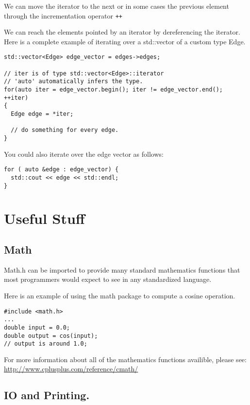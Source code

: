 \documentclass[12pt, letterpaper]{article}
\begin{document}
We can move the iterator to the next or in some cases the previous element through the incrementation operator \texttt{++}

We can reach the elements pointed by an iterator by dereferencing the iterator.\\

Here is a complete example of iterating over a std::vector of a custom type Edge.

\begin{verbatim}
std::vector<Edge> edge_vector = edges->edges;

// iter is of type std::vector<Edge>::iterator
// 'auto' automatically infers the type.
for(auto iter = edge_vector.begin(); iter != edge_vector.end(); ++iter)
{
  Edge edge = *iter;

  // do something for every edge.
}
\end{verbatim}

You could also iterate over the edge vector as follows:

\begin{verbatim}
for ( auto &edge : edge_vector) {
  std::cout << edge << std::endl;
}
\end{verbatim}

\newpage
\section{Useful Stuff}

\subsection{Math}

Math.h can be imported to provide many standard mathematics functions that most programmers would expect to see in any standardized language.

Here is an example of using the math package to compute a cosine operation.

\begin{verbatim}
#include <math.h>
...
double input = 0.0;
double output = cos(input);
// output is around 1.0;
\end{verbatim}

For more information about all of the mathematics functions availible, please see: \\
\href{http://www.cplusplus.com/reference/cmath/}{http://www.cplusplus.com/reference/cmath/}



\subsection{IO and Printing.} \label{printing}
\end{document}
